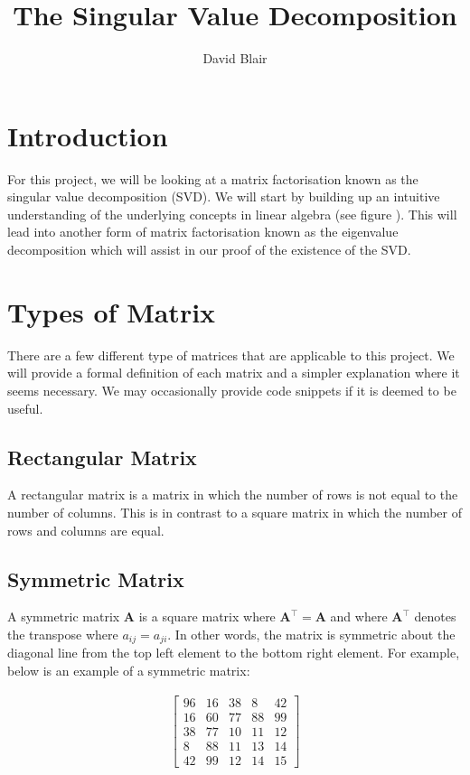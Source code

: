 \documentclass[12pt]{book}
\title{The Singular Value Decomposition}
\author{David Blair}
\begin{document}
	
	\section{Introduction}
	For this project, we will be looking at a matrix factorisation known as the singular value decomposition (SVD). We will start by building up an intuitive understanding of the underlying concepts in linear algebra (see figure ). This will lead into another form of matrix factorisation known as the eigenvalue decomposition which will assist in our proof of the existence of the SVD. 
	
	\section{Types of Matrix}
	There are a few different type of matrices that are applicable to this project. We will provide a formal definition of each matrix and a simpler explanation where it seems necessary. We may occasionally provide code snippets if it is deemed to be useful.   
	
	\subsection{Rectangular Matrix}
	A rectangular matrix is a matrix in which the number of rows is not equal to the number of columns. This is in contrast to a square matrix in which the number of rows and columns are equal.
	
	\subsection{Symmetric Matrix}
	A symmetric matrix $\bm{A}$ is a square matrix where $\bm{A}^{\top} = \bm{A}$ and where $\bm{A}^{\top}$ denotes the transpose where $a_{ij} = a_{ji}$. In other words, the matrix is symmetric about the diagonal line from the top left element to the bottom right element. For example, below is an example of a symmetric matrix:
	
	\begin{align}
		\begin{bmatrix}
			96 & 16 & 38 & 8 & 42 \\
			16 & 60 & 77 & 88 & 99 \\
			38 & 77 & 10 & 11 & 12 \\
			8 & 88 & 11 & 13 & 14 \\
			42 & 99 & 12 & 14 & 15
		\end{bmatrix}
	\end{align}
	
\end{document}
